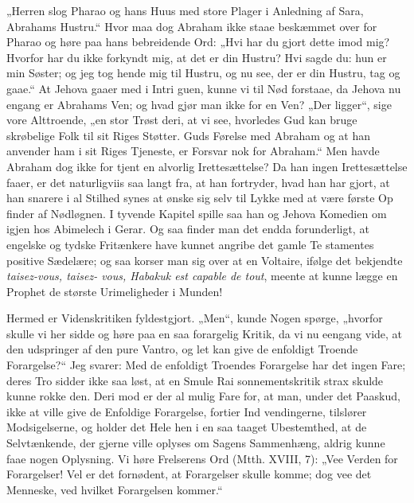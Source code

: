 \documentclass[12pt]{book}
\newcommand{\opage}[1]{\marginnote{\footnotesize\textit{[#1]}}}
\begin{document}
„Herren slog Pharao og hans Huus med store
Plager i Anledning af Sara, Abrahams Hustru.“ Hvor
maa dog Abraham ikke staae beskæmmet over for Pharao
\opage{182}\setcounter{footnote}{0}%
og høre paa hans bebreidende Ord: „Hvi har du gjort
dette imod mig? Hvorfor har du ikke forkyndt mig, at
det er din Hustru? Hvi sagde du: hun er min Søster;
og jeg tog hende mig til Hustru, og nu see, der er din
Hustru, tag og gaae.“ At Jehova gaaer med i Intri\-%
guen, kunne vi til Nød forstaae, da Jehova nu engang
er Abrahams Ven; og hvad gjør man ikke for en Ven?
„Der ligger“, sige vore Alttroende, „en stor Trøst
deri, at vi see, hvorledes Gud kan bruge skrøbelige
Folk til sit Riges Støtter. Guds Førelse med Abraham
og at han anvender ham i sit Riges Tjeneste, er Forsvar
nok for Abraham.“ Men havde Abraham dog ikke for\-%
tjent en alvorlig Irettesættelse? Da han ingen Irettesættelse
faaer, er det naturligviis saa langt fra, at han fortryder,
hvad han har gjort, at han snarere i al Stilhed synes
at ønske sig selv til Lykke med at være første Op\-%
finder af Nødløgnen. I tyvende Kapitel spille saa han
og Jehova Komedien om igjen hos Abimelech i Gerar.
Og saa finder man det endda forunderligt, at engelske og
tydske Fritænkere have kunnet angribe det gamle Te\-%
stamentes positive Sædelære; og saa korser man sig over
at en Voltaire, ifølge det bekjendte \textit{taisez-vous, taisez-%
vous, Habakuk est capable de tout}, meente at kunne
lægge en Prophet de største Urimeligheder i Munden!

Hermed er Videnskritiken fyldestgjort. „Men“,
kunde Nogen spørge, „hvorfor skulle vi her sidde og
høre paa en saa forargelig Kritik, da vi nu eengang
vide, at den udspringer af den pure Vantro, og let kan
give de enfoldigt Troende Forargelse?“ Jeg svarer:
Med de enfoldigt Troendes Forargelse har det ingen
Fare; deres Tro sidder ikke saa løst, at en Smule Rai\-%
sonnementskritik strax skulde kunne rokke den. Deri\-%
mod er der al mulig Fare for, at man, under det Paaskud,
ikke at ville give de Enfoldige Forargelse, fortier Ind\-%
\opage{183}\setcounter{footnote}{0}%
vendingerne, tilslører Modsigelserne, og holder det Hele
hen i en saa taaget Ubestemthed, at de Selvtænkende,
der gjerne ville oplyses om Sagens Sammenhæng, aldrig
kunne faae nogen Oplysning. Vi høre Frelserens Ord
(Mtth. XVIII, 7): „Vee Verden for Forargelser! Vel
er det fornødent, at Forargelser skulle komme; dog vee
det Menneske, ved hvilket Forargelsen kommer.“
\end{document}
